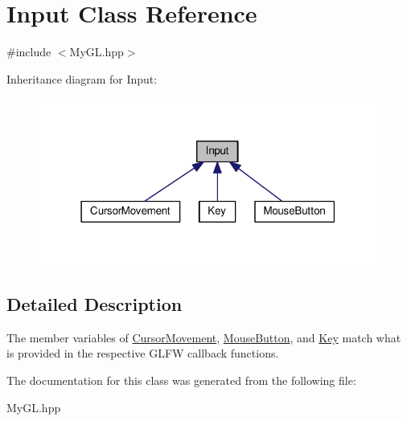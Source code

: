 \hypertarget{classInput}{}\section{Input Class Reference}
\label{classInput}


{\ttfamily \#include $<$My\+G\+L.\+hpp$>$}



Inheritance diagram for Input\+:\nopagebreak
\begin{figure}[H]
\begin{center}
\leavevmode
\includegraphics[width=316pt]{classInput__inherit__graph}
\end{center}
\end{figure}


\subsection{Detailed Description}
The member variables of \hyperlink{classCursorMovement}{Cursor\+Movement}, \hyperlink{classMouseButton}{Mouse\+Button}, and \hyperlink{classKey}{Key} match what is provided in the respective G\+L\+F\+W callback functions. 

The documentation for this class was generated from the following file\+:\begin{DoxyCompactItemize}
\item 
My\+G\+L.\+hpp\end{DoxyCompactItemize}
